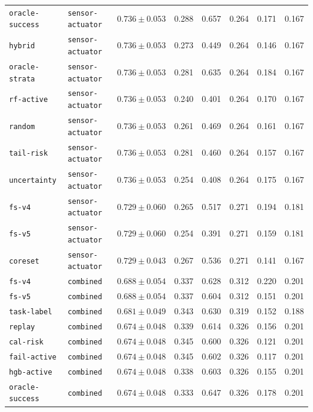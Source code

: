 \documentclass{article}
\begin{document}
\begin{center}
\begin{tabular}{llcccccc}
\texttt{oracle-success} & \texttt{sensor-actuator} & $0.736 \pm 0.053$ & 0.288 & 0.657 & 0.264 & 0.171 & 0.167 \\
\texttt{hybrid} & \texttt{sensor-actuator} & $0.736 \pm 0.053$ & 0.273 & 0.449 & 0.264 & 0.146 & 0.167 \\
\texttt{oracle-strata} & \texttt{sensor-actuator} & $0.736 \pm 0.053$ & 0.281 & 0.635 & 0.264 & 0.184 & 0.167 \\
\texttt{rf-active} & \texttt{sensor-actuator} & $0.736 \pm 0.053$ & 0.240 & 0.401 & 0.264 & 0.170 & 0.167 \\
\texttt{random} & \texttt{sensor-actuator} & $0.736 \pm 0.053$ & 0.261 & 0.469 & 0.264 & 0.161 & 0.167 \\
\texttt{tail-risk} & \texttt{sensor-actuator} & $0.736 \pm 0.053$ & 0.281 & 0.460 & 0.264 & 0.157 & 0.167 \\
\texttt{uncertainty} & \texttt{sensor-actuator} & $0.736 \pm 0.053$ & 0.254 & 0.408 & 0.264 & 0.175 & 0.167 \\
\texttt{fs-v4} & \texttt{sensor-actuator} & $0.729 \pm 0.060$ & 0.265 & 0.517 & 0.271 & 0.194 & 0.181 \\
\texttt{fs-v5} & \texttt{sensor-actuator} & $0.729 \pm 0.060$ & 0.254 & 0.391 & 0.271 & 0.159 & 0.181 \\
\texttt{coreset} & \texttt{sensor-actuator} & $0.729 \pm 0.043$ & 0.267 & 0.536 & 0.271 & 0.141 & 0.167 \\
\texttt{fs-v4} & \texttt{combined} & $0.688 \pm 0.054$ & 0.337 & 0.628 & 0.312 & 0.220 & 0.201 \\
\texttt{fs-v5} & \texttt{combined} & $0.688 \pm 0.054$ & 0.337 & 0.604 & 0.312 & 0.151 & 0.201 \\
\texttt{task-label} & \texttt{combined} & $0.681 \pm 0.049$ & 0.343 & 0.630 & 0.319 & 0.152 & 0.188 \\
\texttt{replay} & \texttt{combined} & $0.674 \pm 0.048$ & 0.339 & 0.614 & 0.326 & 0.156 & 0.201 \\
\texttt{cal-risk} & \texttt{combined} & $0.674 \pm 0.048$ & 0.345 & 0.600 & 0.326 & 0.121 & 0.201 \\
\texttt{fail-active} & \texttt{combined} & $0.674 \pm 0.048$ & 0.345 & 0.602 & 0.326 & 0.117 & 0.201 \\
\texttt{hgb-active} & \texttt{combined} & $0.674 \pm 0.048$ & 0.338 & 0.603 & 0.326 & 0.155 & 0.201 \\
\texttt{oracle-success} & \texttt{combined} & $0.674 \pm 0.048$ & 0.333 & 0.647 & 0.326 & 0.178 & 0.201 \\
\bottomrule
\end{tabular}
\end{center}
\end{document}
